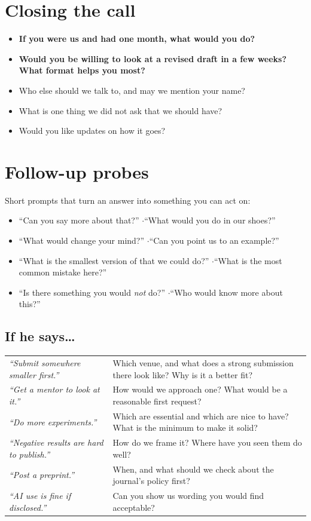 \documentclass[10.5pt]{article}
\newcommand{\Q}[1]{\item[$\square$] #1}
\newcommand{\QS}[1]{\item[\textbf{$\star$}] \textbf{#1}}
\begin{document}
\section{Closing the call}
\begin{itemize}
\QS{If you were us and had one month, what would you do?}
\QS{Would you be willing to look at a revised draft in a few weeks? What format helps you most?}
\Q{Who else should we talk to, and may we mention your name?}
\Q{What is one thing we did not ask that we should have?}
\Q{Would you like updates on how it goes?}
\end{itemize}

\section{Follow-up probes}
Short prompts that turn an answer into something you can act on:
\begin{itemize}
\item ``Can you say more about that?'' \quad$\cdot$\quad ``What would you do in our shoes?''
\item ``What would change your mind?'' \quad$\cdot$\quad ``Can you point us to an example?''
\item ``What is the smallest version of that we could do?'' \quad$\cdot$\quad ``What is the most common mistake here?''
\item ``Is there something you would \emph{not} do?'' \quad$\cdot$\quad ``Who would know more about this?''
\end{itemize}

\subsection*{If he says\ldots}
\begin{tabular}{@{}p{5.2cm}p{10.3cm}@{}}
\textit{``Submit somewhere smaller first.''} & Which venue, and what does a strong submission there look like? Why is it a better fit?\\[3pt]
\textit{``Get a mentor to look at it.''} & How would we approach one? What would be a reasonable first request?\\[3pt]
\textit{``Do more experiments.''} & Which are essential and which are nice to have? What is the minimum to make it solid?\\[3pt]
\textit{``Negative results are hard to publish.''} & How do we frame it? Where have you seen them do well?\\[3pt]
\textit{``Post a preprint.''} & When, and what should we check about the journal's policy first?\\[3pt]
\textit{``AI use is fine if disclosed.''} & Can you show us wording you would find acceptable?\\
\end{tabular}
\end{document}
